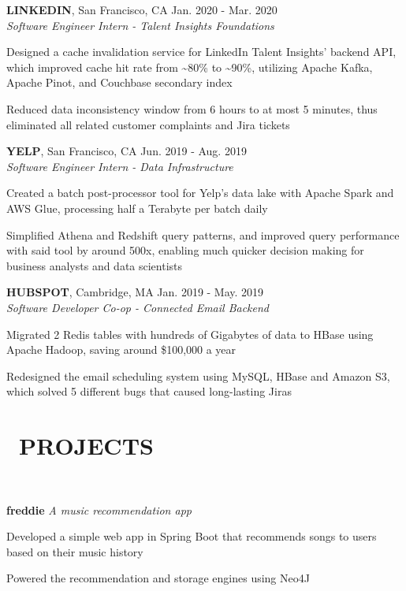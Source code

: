 \documentclass[11pt]{res}
\newcommand{\sectionunderline}{\vspace{-3mm}\hrulefill\\}
\newcommand{\newsect}[1]{\section{\Large \bf #1}}
\begin{document}
\begin{resume}
{{      {\bf LINKEDIN}, San Francisco, CA \hfill Jan. 2020 - Mar. 2020\\
      {\it Software Engineer Intern - Talent Insights Foundations}
      \begin{itemize}
        {\item Designed a cache invalidation service for LinkedIn Talent Insights' backend API, which improved cache hit rate from \textasciitilde80\% to \textasciitilde90\%, utilizing Apache Kafka, Apache Pinot, and Couchbase secondary index}
        {\item Reduced data inconsistency window from 6 hours to at most 5 minutes, thus eliminated all related customer complaints and Jira tickets}
      \end{itemize}

      {\bf YELP}, San Francisco, CA \hfill Jun. 2019 - Aug. 2019\\
      {\it Software Engineer Intern - Data Infrastructure}
      \begin{itemize}
        {\item Created a batch post-processor tool for Yelp's data lake with Apache Spark and AWS Glue, processing half a Terabyte per batch daily}
        {\item Simplified Athena and Redshift query patterns, and improved query performance with said tool by around 500x, enabling much quicker decision making for business analysts and data scientists}
      \end{itemize}

      {\bf HUBSPOT}, Cambridge, MA \hfill Jan. 2019 - May. 2019\\
      {\it Software Developer Co-op - Connected Email Backend}
      \begin{itemize}
        {\item Migrated 2 Redis tables with hundreds of Gigabytes of data to HBase using Apache Hadoop, saving around \$100,000 a year}
        {\item Redesigned the email scheduling system using MySQL, HBase and Amazon S3, which solved 5 different bugs that caused long-lasting Jiras}
      \end{itemize}
    }
  }

  \newsect{\faGithubAlt\ PROJECTS}{
    \sectionunderline{
      {\bf freddie} {\it A music recommendation app}
      \begin{itemize}
        {\item Developed a simple web app in Spring Boot that recommends songs to users based on their music history}
        {\item Powered the recommendation and storage engines using Neo4J}
      \end{itemize}

}}
\end{resume}
\end{document}
